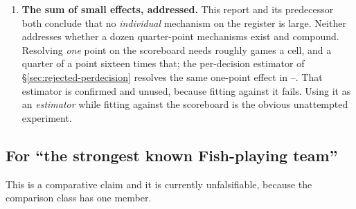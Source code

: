 \begin{enumerate}
\item \textbf{The sum of small effects, addressed.} This report and its predecessor both conclude that
  no \emph{individual} mechanism on the register is large. Neither addresses whether a dozen
  quarter-point mechanisms exist and compound. Resolving \emph{one} point on the scoreboard needs roughly \vsevenScoreboardGames{} games a cell,
  and a quarter of a point sixteen times that; the per-decision estimator of
  \S\ref{sec:rejected-perdecision} resolves the same one-point effect in
  \vsevenPerDecisionGamesLo{}--\vsevenPerDecisionGamesHi{}. That estimator is confirmed and unused,
  because fitting against it fails. Using it as an \emph{estimator} while fitting against the
  scoreboard is the obvious unattempted experiment.

\end{enumerate}

\subsection{For ``the strongest known Fish-playing team''}
\label{sec:towardone-strongest}

This is a comparative claim and it is currently unfalsifiable, because the comparison class has one
member.

